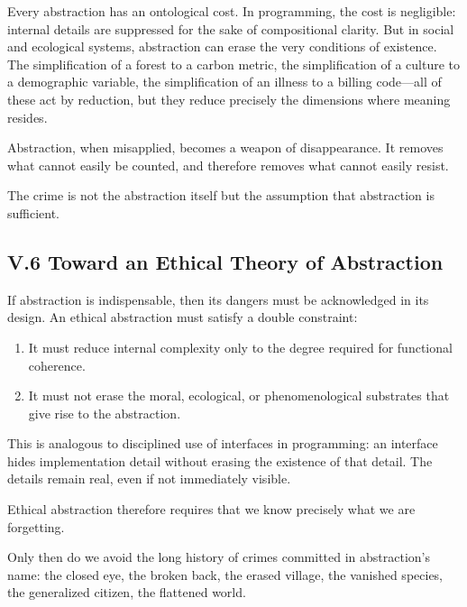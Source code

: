 \documentclass[12pt,letterpaper]{article}
\begin{document}
Every abstraction has an ontological cost. In programming, the cost is negligible: internal details are suppressed for the sake of compositional clarity. But in social and ecological systems, abstraction can erase the very conditions of existence. The simplification of a forest to a carbon metric, the simplification of a culture to a demographic variable, the simplification of an illness to a billing code—all of these act by reduction, but they reduce precisely the dimensions where meaning resides.

Abstraction, when misapplied, becomes a weapon of disappearance. It removes what cannot easily be counted, and therefore removes what cannot easily resist.

The crime is not the abstraction itself but the assumption that abstraction is sufficient.

\subsection{V.6 Toward an Ethical Theory of Abstraction}

If abstraction is indispensable, then its dangers must be acknowledged in its design. An ethical abstraction must satisfy a double constraint:

\begin{enumerate}
\item It must reduce internal complexity only to the degree required for functional coherence.
\item It must not erase the moral, ecological, or phenomenological substrates that give rise to the abstraction.
\end{enumerate}

This is analogous to disciplined use of interfaces in programming: an interface hides implementation detail without erasing the existence of that detail. The details remain real, even if not immediately visible.

Ethical abstraction therefore requires that we know precisely what we are forgetting.

Only then do we avoid the long history of crimes committed in abstraction’s name: the closed eye, the broken back, the erased village, the vanished species, the generalized citizen, the flattened world.

\newpage

\end{document}
